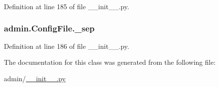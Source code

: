 Definition at line 185 of file \-\_\-\-\_\-init\-\_\-\-\_\-.\-py.

\hypertarget{classadmin_1_1ConfigFile_a3f7db562c59049e6a3b28b1fdfafa63e}{
\subsubsection[{\-\_\-sep}]{\setlength{\rightskip}{0pt plus 5cm}admin.\-Config\-File.\-\_\-sep\hspace{0.3cm}{\ttfamily [private]}}}\label{classadmin_1_1ConfigFile_a3f7db562c59049e6a3b28b1fdfafa63e}


Definition at line 186 of file \-\_\-\-\_\-init\-\_\-\-\_\-.\-py.



The documentation for this class was generated from the following file\-:\begin{DoxyCompactItemize}
\item 
admin/\hyperlink{____init_____8py}{\-\_\-\-\_\-init\-\_\-\-\_\-.\-py}\end{DoxyCompactItemize}
